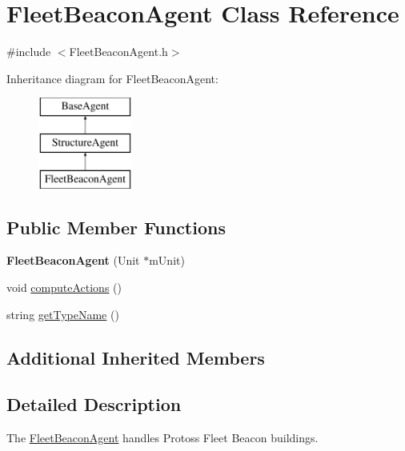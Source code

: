 \hypertarget{class_fleet_beacon_agent}{\section{Fleet\-Beacon\-Agent Class Reference}
\label{class_fleet_beacon_agent}
}


{\ttfamily \#include $<$Fleet\-Beacon\-Agent.\-h$>$}

Inheritance diagram for Fleet\-Beacon\-Agent\-:\begin{figure}[H]
\begin{center}
\leavevmode
\includegraphics[height=3.000000cm]{class_fleet_beacon_agent}
\end{center}
\end{figure}
\subsection*{Public Member Functions}
\begin{DoxyCompactItemize}
\item 
\hypertarget{class_fleet_beacon_agent_a3527356c7ff919b62298df950e3b3eca}{{\bfseries Fleet\-Beacon\-Agent} (Unit $\ast$m\-Unit)}\label{class_fleet_beacon_agent_a3527356c7ff919b62298df950e3b3eca}

\item 
void \hyperlink{class_fleet_beacon_agent_af4097bf4cdc94bd32db440b2c8919d7b}{compute\-Actions} ()
\item 
string \hyperlink{class_fleet_beacon_agent_ad879f73a893bf35a31e66c7ee8ebaae2}{get\-Type\-Name} ()
\end{DoxyCompactItemize}
\subsection*{Additional Inherited Members}


\subsection{Detailed Description}
The \hyperlink{class_fleet_beacon_agent}{Fleet\-Beacon\-Agent} handles Protoss Fleet Beacon buildings.


